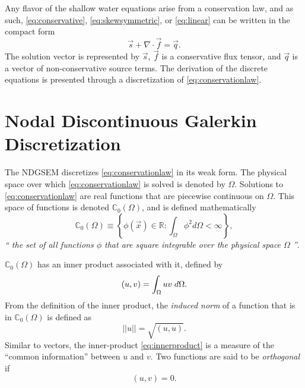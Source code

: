 \documentclass{softwaremanual}
\begin{document}
Any flavor of the shallow water equations arise from a conservation law, and as such, \eqref{eq:conservative}, \eqref{eq:skewsymmetric}, or \eqref{eq:linear} can be written in the compact form
\begin{equation}
\vec{s} + \nabla \cdot \vec{f} = \vec{q}. \label{eq:conservationlaw}
\end{equation}
The solution vector is represented by $\vec{s}$, $\vec{f}$ is a conservative flux tensor, and $\vec{q}$ is a vector of non-conservative source terms. The derivation of the discrete equations is presented through a discretization of \eqref{eq:conservationlaw}. 

\section{Nodal Discontinuous Galerkin Discretization}
The NDGSEM discretizes \eqref{eq:conservationlaw} in its weak form. The physical space over which \eqref{eq:conservationlaw} is solved is denoted by $\Omega$. Solutions to \eqref{eq:conservationlaw} are real functions that are piecewise continuous on $\Omega$. This space of functions is denoted $\mathbb{C}_0(\Omega)$, and is defined mathematically
\begin{equation}
\mathbb{C}_0(\Omega) \equiv \left\lbrace \phi(\vec{x}) \in \mathbb{R} : \int_{\Omega} \phi^2 d\Omega < \infty \right\rbrace,
\end{equation}
\textit{`` the set of all functions $\phi$ that are square integrable over the physical space $\Omega$ ''}.

$\mathbb{C}_0(\Omega)$ has an inner product associated with it, defined by
\begin{equation}
(u,v) = \int_{\Omega} uv \hspace{1mm} d\Omega. \label{eq:innerproduct}
\end{equation}
From the definition of the inner product, the \textit{induced norm} of a function that is in $\mathbb{C}_0(\Omega)$ is defined as
\begin{equation}
||u|| = \sqrt{(u,u)}.\label{eq:norm}
\end{equation}
Similar to vectors, the inner-product \eqref{eq:innerproduct} is a measure of the ``common information'' between $u$ and $v$. Two functions are said to be \textit{orthogonal} if
\begin{equation}
(u,v) = 0. \label{eq:orthogonality}
\end{equation}
\end{document}
